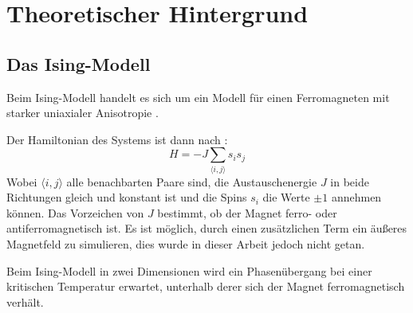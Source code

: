 \documentclass{scrreprt}
\begin{document}
	
	
	
	\chapter{Theoretischer Hintergrund}
	\label{chap:theorie}
	
	\section{Das Ising-Modell}
	\label{sec:isingtheorie}
	Beim Ising-Modell handelt es sich um ein Modell für einen Ferromagneten mit starker uniaxialer Anisotropie \cite[S. 7]{binderheermann}. %
	
	Der Hamiltonian des Systems ist dann nach \cite[S. 7]{binderheermann}:
	\begin{equation}
	H=-J\sum_{\langle i,j\rangle }s_is_j
	\label{eq:hamiltonianising}
	\end{equation}
	Wobei $\langle i,j\rangle$ alle benachbarten Paare sind, die Austauschenergie $J$ in beide Richtungen gleich und konstant ist und die Spins $s_i$ die  Werte $\pm 1$ annehmen können. Das Vorzeichen von $J$ bestimmt, ob der Magnet ferro- oder antiferromagnetisch ist. Es ist möglich, durch einen zusätzlichen Term ein äußeres Magnetfeld zu simulieren, dies wurde in dieser Arbeit jedoch nicht getan.%

	
	Beim Ising-Modell in zwei Dimensionen wird ein Phasenübergang bei einer kritischen Temperatur erwartet, unterhalb derer sich der Magnet ferromagnetisch verhält\cite[vgl. ][]{peierls_1936}.
	
\end{document}
